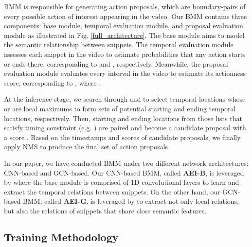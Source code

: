 \documentclass{bmvc2k}
\begin{document}
BMM is responsible for generating action proposals, which are boundary-pairs of every possible action of interest appearing in the video. Our BMM contains three components: base module, temporal evaluation module, and proposal evaluation module as illustrated in Fig. \ref{full_architecture}. The base module aims to model the semantic relationship between snippets. The temporal evaluation module assesses each snippet  in the video to estimate probabilities that any action starts or ends there, corresponding to  and , respectively. Meanwhile, the proposal evaluation module evaluates every interval  in the video to estimate its actionness score, corresponding to , where .














At the inference stage, we search through  and  to select temporal locations  whose  or  are local maximums to form sets of potential starting and ending temporal locations, respectively. Then, starting and ending locations  from those lists that satisfy timing constraint (e.g. ) are paired and become a candidate proposal with a score . 
Based on the timestamps and scores of candidate proposals, we finally apply NMS \cite{SoftNMS, NMS} to produce the final set of action proposals.







In our paper, we have conducted BMM under two different network architectures: CNN-based and GCN-based. Our CNN-based BMM, called \textbf{AEI-B}, is leveraged by \cite{bmn} where the base module is comprised of 1D convolutional layers to learn and extract the temporal relations between snippets. On the other hand, our GCN-based BMM, called \textbf{AEI-G}, is leveraged by \cite{xu2020gtad} to extract not only local relations, but also the relations of snippets that share close semantic features.










\subsection{Training Methodology}
\label{subsec:train_method}
\end{document}
